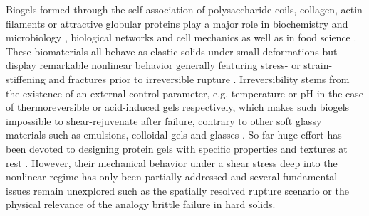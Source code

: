 \documentclass[twocolumn,superscriptaddress,showpacs,preprintnumbers,amsmath,amssymb,prl]{revtex4}
\begin{document}

Biogels formed through the self-association of polysaccharide coils, collagen, actin filaments or attractive globular proteins play a major role in biochemistry and microbiology \cite{Viovy:2000}, biological networks and cell mechanics \cite{Stricker:2010} as well as in food science \cite{Mezzenga:2005}. These biomaterials all behave as elastic solids under small deformations but display remarkable nonlinear behavior generally featuring stress- or strain-stiffening \cite{Gardel:2004} and fractures prior to irreversible rupture \cite{Bonn:1998,Baumberger:2006,Daniels:2007}. Irreversibility stems from the existence of an external control parameter, e.g. temperature or pH in the case of thermoreversible or acid-induced gels respectively, which makes such biogels impossible to shear-rejuvenate after failure, contrary to other soft glassy materials such as emulsions, colloidal gels and glasses \cite{Cloitre:2000,Divoux:2012,Siebenburger:2012}. So far huge effort has been devoted to designing protein gels with specific properties and textures at rest \cite{Dickinson:2006,Gibaud:2012}. However, their mechanical behavior under a shear stress deep into the nonlinear regime has only been partially addressed \cite{vanVliet:1995} and several fundamental issues remain unexplored such as the spatially resolved rupture scenario or the physical relevance of the analogy brittle failure in hard solids.
\end{document}
